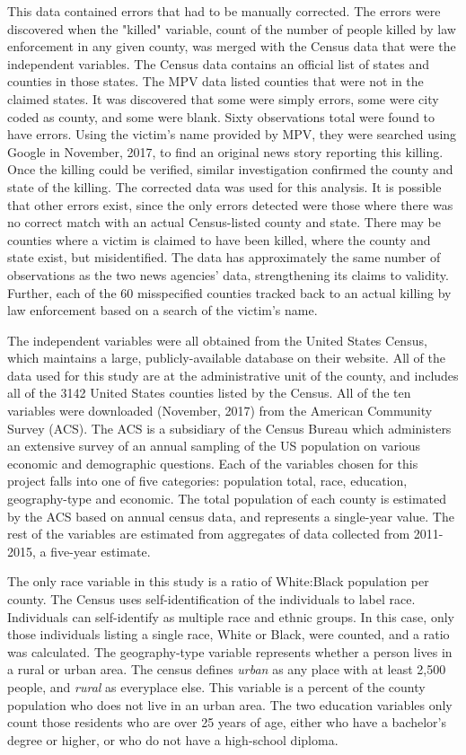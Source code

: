 \documentclass[sigconf]{acmart}
\begin{document}
This data contained errors that had to be manually corrected.  The errors were discovered when the "killed" variable, count of the number of people killed by law enforcement in any given county, was merged with the Census data that were the independent variables.  The Census data contains an official list of states and counties in those states. The MPV data listed counties that were not in the claimed states.  It was discovered that some were simply errors, some were city coded as county, and some were blank.  Sixty observations total were found to have errors.  Using the victim's name provided by MPV, they were searched using Google in November, 2017, to find an original news story reporting this killing.  Once the killing could be verified, similar investigation confirmed the county and state of the killing.  The corrected data was used for this analysis.  It is possible that other errors exist, since the only errors detected were those where there was no correct match with an actual Census-listed county and state.  There may be counties where a victim is claimed to have been killed, where the county and state exist, but misidentified.  The data has approximately the same number of observations as the two news agencies' data, strengthening its claims to validity.  Further, each of the 60 misspecified counties tracked back to an actual killing by law enforcement based on a search of the victim's name.

The independent variables were all obtained from the United States Census, which maintains a large, publicly-available database on their website. \cite{census}  All of the data used for this study are at the administrative unit of the county, and includes all of the 3142 United States counties listed by the Census.  All of the ten variables were downloaded (November, 2017) from the American Community Survey (ACS). The ACS is a subsidiary of the Census Bureau which administers an extensive survey of an annual sampling of the US population on various economic and demographic questions.  Each of the variables chosen for this project falls into one of five categories: population total, race, education, geography-type and economic.  The total population of each county is estimated by the ACS based on annual census data, and represents a single-year value.  The rest of the variables are estimated from aggregates of data collected from 2011-2015, a five-year estimate.  

The only race variable in this study is a ratio of White:Black population per county.  The Census uses self-identification of the individuals to label race.  Individuals can self-identify as multiple race and ethnic groups.  In this case, only those individuals listing a single race, White or Black, were counted, and a ratio was calculated.  The geography-type variable represents whether a person lives in a rural or urban area.  The census defines {\em urban} as any place with at least 2,500 people, and {\em rural} as everyplace else.  This variable is a percent of the county population who does not live in an urban area.  The two education variables only count those residents who are over 25 years of age, either who have a bachelor's degree or higher, or who do not have a  high-school diploma.  
\end{document}
